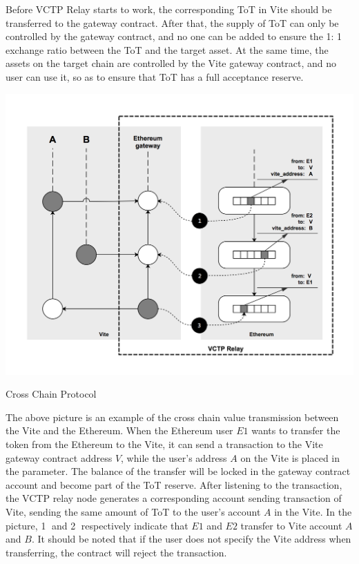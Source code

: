 \documentclass[UTF8,nofonts]{article}
\makeatletter
\newenvironment{figurehere}
 {\def\@captype{figure}}
 {}
\makeatother
\begin{document}
\begin{multicols}{2}
Before VCTP Relay starts to work, the corresponding ToT in Vite should be transferred to the gateway contract. After that, the supply of ToT can only be controlled by the gateway contract, and no one can be added to ensure the 1: 1 exchange ratio between the ToT and the target asset. At the same time, the assets on the target chain are controlled by the Vite gateway contract, and no user can use it, so as to ensure that ToT has a full acceptance reserve.

\begin{center}
\begin{figurehere}
\includegraphics[width=\linewidth]{image/crosschain.png}
\caption{Cross Chain Protocol}
\end{figurehere}
\end{center}

The above picture is an example of the cross chain value transmission between the Vite and the Ethereum. When the Ethereum user $E1$ wants to transfer the token from the Ethereum to the Vite, it can send a transaction to the Vite gateway contract address $V$, while the user's address $A$ on the Vite is placed in the parameter. The balance of the transfer will be locked in the gateway contract account and become part of the ToT reserve. After listening to the transaction, the VCTP relay node generates a corresponding account sending transaction of Vite, sending the same amount of ToT to the user's account $A$ in the Vite. In the picture, \textcircled{1} and \textcircled{2} respectively indicate that $E1$ and $E2$ transfer to Vite account $A$ and $B$. It should be noted that if the user does not specify the Vite address when transferring, the contract will reject the transaction.


\end{multicols}
\end{document}

